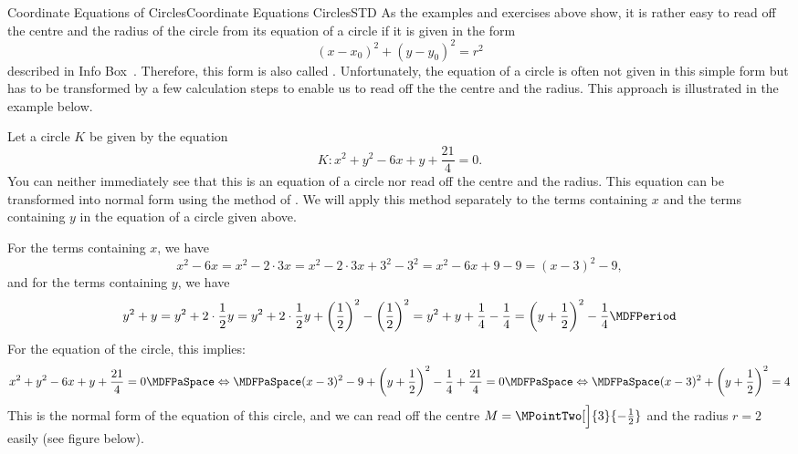\begin{MXContent}{Coordinate Equations of Circles}{Coordinate Equations Circles}{STD}
As the examples and exercises above show, it is rather easy to read off the centre and the radius of the circle 
from its equation of a circle if it is given in the form
\[
 (x-x_0)^2+(y-y_0)^2=r^2
\]
described in Info Box~. Therefore, this form is also called 
. Unfortunately, the equation of a circle is often not 
given in this simple form but has to be transformed by a few calculation steps to enable us to read off the 
the centre and the radius. This approach is illustrated in the example below.

\begin{MExample}
Let a circle $K$ be given by the equation
\[
 K\colon x^2+y^2-6x+y+\frac{21}{4}=0.
\]
You can neither immediately see that this is an equation of a circle nor read off the centre and the radius. This equation can be transformed into normal form using the method of 
. We will apply this method separately to the terms containing $x$ and the 
terms containing $y$ in the equation of a circle given above.

For the terms containing $x$, we have
\[
 x^2-6x = x^2 -2\cdot3x = x^2 -2\cdot3x +3^2-3^2 = x^2-6x+9-9 = (x-3)^2-9,
\]
and for the terms containing $y$, we have
\[
 y^2+y = y^2+2\cdot\frac{1}{2}y =  y^2+2\cdot\frac{1}{2}y + \left(\frac{1}{2}\right)^2 - \left(\frac{1}{2}\right)^2 = y^2+y+\frac{1}{4}-\frac{1}{4}=\left(y+\frac{1}{2}\right)^2-\frac{1}{4}\MDFPeriod 
\]
For the equation of the circle, this implies:
\[
 x^2+y^2-6x+y+\frac{21}{4}=0\MDFPaSpace\Leftrightarrow\MDFPaSpace (x-3)^2-9 + \left(y+\frac{1}{2}\right)^2-\frac{1}{4}+\frac{21}{4}=0\MDFPaSpace\Leftrightarrow\MDFPaSpace (x-3)^2+ \left(y+\frac{1}{2}\right)^2=4
\]
This is the normal form of the equation of this circle, and we can read off the centre $M=\MPointTwo[\Big]{3}{-\frac{1}{2}}$
and the radius $r=2$ easily (see figure below).
\begin{center}
\end{center}
\end{MExample}
\end{MXContent}

